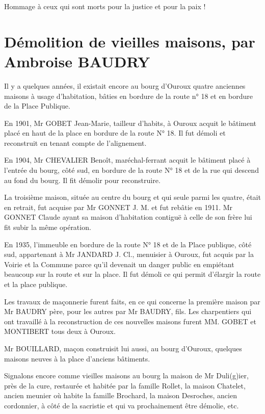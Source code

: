 Hommage à ceux qui sont morts pour la justice et pour la paix !
\fi

\section*{Démolition de vieilles maisons, par Ambroise BAUDRY}

Il y a quelques années, il existait encore au bourg d'Ouroux quatre anciennes maisons à usage d'habitation, bâties en bordure de la route n° 18 et en bordure de la Place Publique.

En 1901, Mr GOBET Jean-Marie, tailleur d'habits, à Ouroux acquit le bâtiment placé en haut de la place en bordure de la route N° 18. Il fut démoli et reconstruit en tenant compte de l'alignement.

En 1904, Mr CHEVALIER Benoît, maréchal-ferrant acquit le bâtiment placé à l'entrée du bourg, côté sud, en bordure de la route N° 18 et de la rue qui descend au fond du bourg. Il fit démolir pour reconstruire.

La troisième maison, située au centre du bourg et qui seule parmi les quatre, était en retrait, fut acquise par Mr GONNET J. M. et fut rebâtie en 1911. Mr GONNET Claude ayant sa maison d'habitation contiguë à celle de son frère lui fit subir la même opération.

En 1935, l'immeuble en bordure de la route N° 18 et de la Place publique, côté sud, appartenant à Mr JANDARD J. Cl., menuisier à Ouroux, fut acquis par la Voirie et la Commune parce qu'il devenait un danger public en empiétant beaucoup sur la route et sur la place. Il fut démoli ce qui permit d'élargir la route et la place publique.

Les travaux de maçonnerie furent faits, en ce qui concerne la première maison par Mr BAUDRY père, pour les autres par Mr BAUDRY, fils. Les charpentiers qui ont travaillé à la reconstruction de ces nouvelles maisons furent MM. GOBET et MONTIBERT tous deux à Ouroux.

Mr BOUILLARD, maçon construisit lui aussi, au bourg d'Ouroux, quelques maisons neuves à la place d'anciens bâtiments.

Signalons encore comme vieilles maisons au bourg la maison de Mr Duli(g)ier, près de la cure, restaurée et habitée par la famille Rollet, la maison Chatelet, ancien meunier où habite la famille Brochard, la maison Desroches, ancien cordonnier, à côté de la sacristie et qui va prochainement être démolie, etc.

